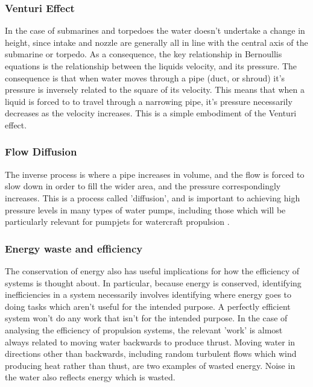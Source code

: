 \documentclass{article}\usepackage[]{graphicx}\usepackage[]{color}
\begin{document}
\subsubsection{Venturi Effect}
In the case of submarines and torpedoes the water doesn't undertake a change in height, since intake and nozzle are generally all in line with the central axis of the submarine or torpedo.  As a consequence, the key relationship in Bernoullis equations is the relationship between the liquids velocity, and its pressure.  The consequence is that when water moves through a pipe (duct, or shroud) it's pressure is inversely related to the square of its velocity.  This means that when a liquid is forced to to travel through a narrowing pipe, it's pressure necessarily decreases as the velocity increases.  This is a simple embodiment of the Venturi effect.

\subsubsection{Flow Diffusion}
The inverse process is where a pipe increases in volume, and the flow is forced to slow down in order to fill the wider area, and the pressure correspondingly increases.  This is a process called 'diffusion', and is important to achieving high pressure levels in many types of water pumps, including those which will be particularly relevant for pumpjets for watercraft propulsion \parencite{hamilton1997}.

\subsubsection{Energy waste and efficiency}
The conservation of energy also has useful implications for how the efficiency of systems is thought about.  In particular, because energy is conserved, identifying inefficiencies in a system necessarily involves identifying where energy goes to doing tasks which aren't useful for the intended purpose.  A perfectly efficient system won't do any work that isn't for the intended purpose.  In the case of analysing the efficiency of propulsion systems, the relevant 'work' is almost always related to moving water backwards to produce thrust.  Moving water in directions other than backwards, including random turbulent flows which wind producing heat rather than thust, are two examples of wasted energy.  Noise in the water also reflects energy which is wasted.
\end{document}
